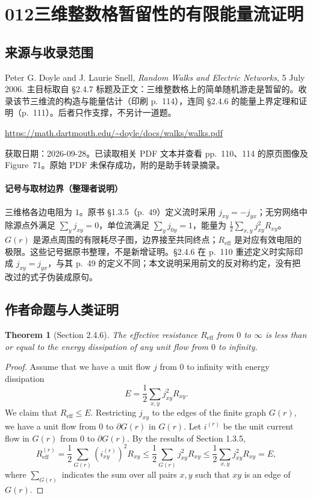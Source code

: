 \documentclass[UTF8,11pt]{ctexart}
\newtheorem*{theorem}{Theorem}
\theoremstyle{definition}
\begin{document}
\section*{012\quad 三维整数格暂留性的有限能量流证明}
\subsection*{来源与收录范围}
Peter G. Doyle and J. Laurie Snell, \emph{Random Walks and Electric Networks}, 5 July 2006. 主目标取自 \S2.4.7 标题及正文：三维整数格上的简单随机游走是暂留的。收录该节三维流的构造与能量估计（印刷 p.~114），连同 \S2.4.6 的能量上界定理和证明（p.~111）。后者只作支撑，不另计一道题。
\par\url{https://math.dartmouth.edu/~doyle/docs/walks/walks.pdf}
\par 获取日期：2026-09-28。已读取相关 PDF 文本并查看 pp.~110、114 的原页图像及 Figure~71。原始 PDF 未保存成功，附的是助手转录摘录。
\paragraph{记号与取材边界（整理者说明）}
三维格各边电阻为 $1$。原书 \S1.3.5（p.~49）定义流时采用 $j_{xy}=-j_{yx}$；无穷网络中除源点外满足 $\sum_yj_{xy}=0$，单位流满足 $\sum_yj_{0y}=1$，能量为 $\frac12\sum_{x,y}j_{xy}^2R_{xy}$。$G(r)$ 是源点周围的有限耗尽子图，边界接至共同终点；$R_{\mathrm{eff}}$ 是对应有效电阻的极限。这些记号据原书整理，不是新增证明。\S2.4.6 在 p.~110 重述定义时实际印成 $j_{xy}=j_{yx}$，与其 p.~49 的定义不同；本文说明采用前文的反对称约定，没有把改过的式子伪装成原句。
\subsection*{作者命题与人类证明}
\begin{theorem}[Section 2.4.6]
The effective resistance $R_{\mathrm{eff}}$ from $0$ to $\infty$ is less than or equal to the energy dissipation of any unit flow from $0$ to infinity.
\end{theorem}
\begin{proof}
Assume that we have a unit flow $j$ from $0$ to infinity with energy dissipation
\[
E=\frac12\sum_{x,y}j_{xy}^2R_{xy}.
\]
We claim that $R_{\mathrm{eff}}\le E$. Restricting $j_{xy}$ to the edges of the finite graph $G(r)$, we have a unit flow from $0$ to $\partial G(r)$ in $G(r)$. Let $i^{(r)}$ be the unit current flow in $G(r)$ from $0$ to $\partial G(r)$. By the results of Section 1.3.5,
\[
R_{\mathrm{eff}}^{(r)}=\frac12\sum_{G(r)}(i^{(r)}_{xy})^2R_{xy}
\le\frac12\sum_{G(r)}j_{xy}^2R_{xy}
\le\frac12\sum_{x,y}j_{xy}^2R_{xy}=E,
\]
where $\sum_{G(r)}$ indicates the sum over all pairs $x,y$ such that $xy$ is an edge of $G(r)$.
\end{proof}
\end{document}
